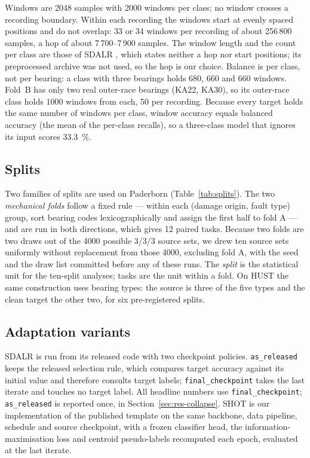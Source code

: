 Windows are 2048 samples with 2000 windows per class; no window crosses a recording boundary. Within each recording the
windows start at evenly spaced positions and do not overlap: 33 or 34 windows per recording of about 256\,800 samples, a
hop of about 7\,700--7\,900 samples. The window length and the count per class are those of SDALR \cite{sdalr2025}, which
states neither a hop nor start positions; its preprocessed archive was not used, so the hop is our choice. Balance is per
class, not per bearing: a class with three bearings holds 680, 660 and 660 windows. Fold~B has only two real outer-race
bearings (KA22, KA30), so its outer-race class holds 1000 windows from each, 50 per recording. Because every target holds the same number of
windows per class, window accuracy equals balanced accuracy (the mean of the per-class recalls), so a three-class model
that ignores its input scores \SI{33.3}{\percent}.

\subsection{Splits}



Two families of splits are used on Paderborn (Table~\ref{tab:splits}). The two \emph{mechanical folds} follow a fixed rule
--- within each (damage origin, fault type) group, sort bearing codes lexicographically and assign the first half to fold A
--- and are run in both directions, which gives 12 paired tasks. Because two folds are two draws out of the 4000 possible
3/3/3 source sets, we drew ten source sets uniformly without replacement from those 4000, excluding fold A, with the seed
and the draw list committed before any of these runs. The \emph{split} is the statistical unit for the ten-split analyses;
tasks are the unit within a fold. On HUST the same construction uses bearing types: the source is three of the five types
and the clean target the other two, for six pre-registered splits.

\subsection{Adaptation variants}

SDALR is run from its released code with two checkpoint policies. \texttt{as\_released} keeps the released selection rule,
which compares target accuracy against its initial value and therefore consults target labels; \texttt{final\_checkpoint}
takes the last iterate and touches no target label. All headline numbers use \texttt{final\_checkpoint};
\texttt{as\_released} is reported once, in Section~\ref{sec:res-collapse}. SHOT is our implementation of the published
template on the same backbone, data pipeline, schedule and source checkpoint, with a frozen classifier head, the
information-maximisation loss and centroid pseudo-labels recomputed each epoch, evaluated at the last iterate.

